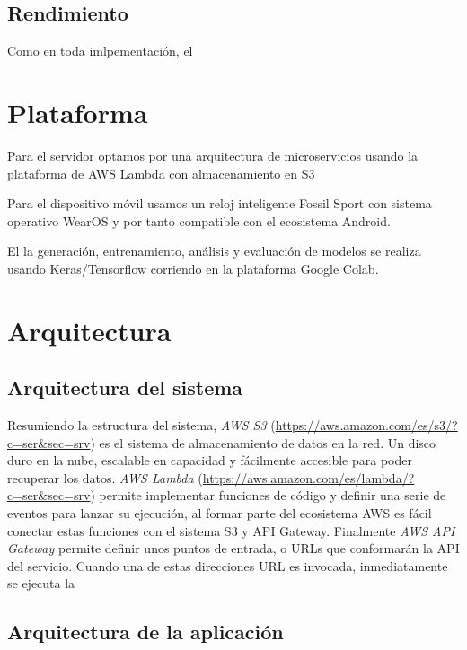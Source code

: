\subsection{Rendimiento}

Como en toda imlpementación, el

\section{Plataforma}
Para el servidor optamos por una arquitectura de microservicios usando la plataforma de AWS Lambda con almacenamiento en S3

Para el dispositivo móvil usamos un reloj inteligente Fossil Sport con sistema operativo WearOS y por tanto compatible con el ecosistema Android.

El la generación, entrenamiento, análisis y evaluación de modelos se realiza usando Keras/Tensorflow corriendo en la plataforma Google Colab.

\section{Arquitectura}\label{desc_archi}

\subsection{Arquitectura del sistema}

Resumiendo la estructura del sistema, \textit{AWS S3} (\url{https://aws.amazon.com/es/s3/?c=ser&sec=srv}) es el sistema de almacenamiento de datos en la red. Un disco duro en la nube, escalable en capacidad y fácilmente accesible para poder recuperar los datos. \textit{AWS Lambda} (\url{https://aws.amazon.com/es/lambda/?c=ser&sec=srv}) permite implementar funciones de código y definir una serie de eventos para lanzar su ejecución, al formar parte del ecosistema AWS es fácil conectar estas funciones con el sistema S3 y API Gateway. Finalmente \textit{AWS API Gateway} permite definir unos puntos de entrada, o URLs que conformarán la API del servicio. Cuando una de estas direcciones URL es invocada, inmediatamente se ejecuta la 
\subsection{Arquitectura de la aplicación}

